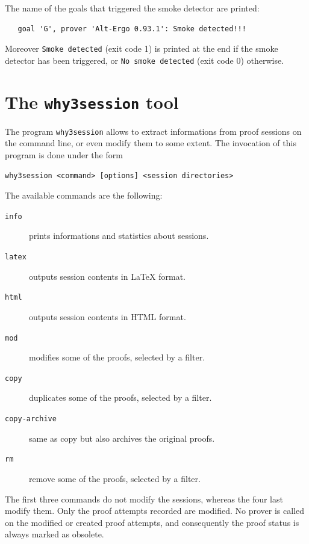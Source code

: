 \noindent
The name of the goals that triggered the smoke detector are printed:
\begin{verbatim}
   goal 'G', prover 'Alt-Ergo 0.93.1': Smoke detected!!!
\end{verbatim}
Moreover \texttt{Smoke detected} (exit code 1) is printed at the end if the smoke
detector has been triggered, or \texttt{No smoke detected} (exit code 0)
otherwise.



\section{The \texttt{why3session} tool}
\label{sec:why3session}

The program \texttt{why3session} allows to extract informations from
proof sessions on the command line, or even modify them to some
extent. The invocation of this program is done under the form
\begin{verbatim}
why3session <command> [options] <session directories>
\end{verbatim}
The available commands are the following:
\begin{description}
\item[\texttt{info}] prints informations and statistics about sessions.
\item[\texttt{latex}] outputs session contents in LaTeX format.
\item[\texttt{html}] outputs session contents in HTML format.
\item[\texttt{mod}] modifies some of the proofs, selected by a filter.
\item[\texttt{copy}] duplicates some of the proofs, selected by a filter.
\item[\texttt{copy-archive}] same as copy but also archives the
  original proofs.
\item[\texttt{rm}] remove some of the proofs, selected by a filter.
\end{description}

The first three commands do not modify the sessions, whereas the four
last modify them. Only the proof attempts recorded are modified. No
prover is called on the modified or created proof attempts, and
consequently the proof status is always marked as obsolete.

